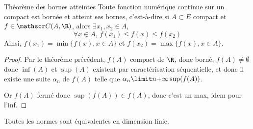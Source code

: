 \begin{theoreme}{Théorème des bornes atteintes}{}
    Toute fonction numérique continue sur un compact est bornée et atteint ses bornes, c'est-à-dire 
    si $A \subset E$ compact et $f \in \mathscr C(A, \R)$, alors 
    $\exists x_1, x_2 \in A$,
    \[\forall x \in A, \, f(x_1) \leqslant f(x) \leqslant f(x_2)\]
    Ainsi, $f(x_1) = \min \{ f(x), x \in A \}$ et $f(x_2) = \max \{ f(x), x \in A \}$.
\end{theoreme}


\begin{proof}
    Par le théorème précédent, $f(A)$ compact de $\R$, donc borné, $f(A) \neq \emptyset$ donc 
    $ \inf(A)$ et $\sup(A)$ existent par caractérisation séquentielle, et donc il existe une suite 
    $\alpha_n$ de $f(A)$ telle que $\alpha_n \limit n {+ \infty} \sup(f(A))$.

    Or $f(A)$ fermé donc $\sup(f(A)) \in f(A)$, donc c'est un max, idem pour l'inf. 
\end{proof}

\begin{theoreme}{}{}
    Toutes les normes sont équivalentes en dimension finie.
\end{theoreme}


